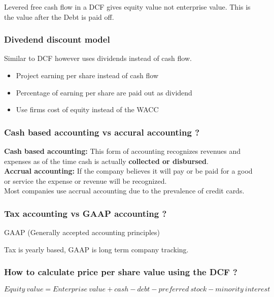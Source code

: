 \documentclass[11pt]{scrartcl} %
\begin{document}
Levered free cash flow in a DCF gives equity value not enterprise value. This is the value after the Debt is paid off.

\subsubsection{Divedend discount model}

Similar to DCF however uses dividends instead of cash flow.

\begin{itemize}
	\item Project earning per share instead of cash flow
	\item Percentage of earning per share are paid out as dividend
	\item Use firms cost of equity instead of the WACC
\end{itemize}

\subsubsection{Cash based accounting vs accural accounting ?}

\textbf{Cash based accounting:} This form of accounting recognizes revenues and expenses as of the time cash is actually \textbf{collected or disbursed}.\\

\textbf{Accrual accounting:} If the company believes it will pay or be paid for a good or service the expense or revenue will be recognized. \\

Most companies use accrual accounting due to the prevalence of credit cards.

\subsubsection{Tax accounting vs GAAP accounting ?}

GAAP (Generally accepted accounting principles)

Tax is yearly based, GAAP is long term company tracking.

\subsubsection{How to calculate price per share value using the DCF ?}

\[ Equity\:value = Enterprise\:value + cash - debt - preferred\:stock - minority\:interest \]
\end{document}
